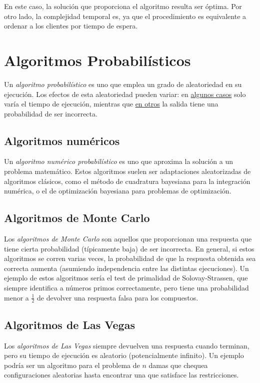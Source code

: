 En este caso, la solución que proporciona el algoritmo resulta ser óptima. Por otro lado, la complejidad temporal es, ya que el procedimiento es equivalente a ordenar a los clientes por tiempo de espera.

\section{Algoritmos Probabilísticos}

Un \textit{algoritmo probabilístico} es uno que emplea un grado de aleatoriedad en su ejecución. Los efectos de esta aleatoriedad pueden variar: en \hyperref[las-vegas]{algunos casos} solo varía el tiempo de ejecución, mientras que \hyperref[monte-carlo]{en otros} la salida tiene una probabilidad de ser incorrecta.

\subsection{Algoritmos numéricos}

Un \textit{algoritmo numérico probabilístico} es uno que aproxima la solución a un problema matemático. Estos algoritmos suelen ser adaptaciones aleatorizadas de algoritmos clásicos, como el método de cuadratura bayesiana para la integración numérica, o el de optimización bayesiana para problemas de optimización.

\subsection{Algoritmos de Monte Carlo}
\label{monte-carlo}

Los \textit{algoritmos de Monte Carlo} son aquellos que proporcionan una respuesta que tiene cierta probabilidad (típicamente baja) de ser incorrecta. En general, si estos algoritmos se corren varias veces, la probabilidad de que la respuesta obtenida sea correcta aumenta (asumiendo independencia entre las distintas ejecuciones). Un ejemplo de estos algoritmos sería el test de primalidad de Solovay-Strassen, que siempre identifica a números primos correctamente, pero tiene una probabilidad menor a $\frac{1}{2}$ de devolver una respuesta falsa para los compuestos.

\subsection{Algoritmos de Las Vegas}
\label{las-vegas}

Los \textit{algoritmos de Las Vegas} siempre devuelven una respuesta cuando terminan, pero su tiempo de ejecución es aleatorio (potencialmente infinito). Un ejemplo podría ser un algoritmo para el problema de $n$ damas que chequea configuraciones aleatorias hasta encontrar una que satisface las restricciones.

